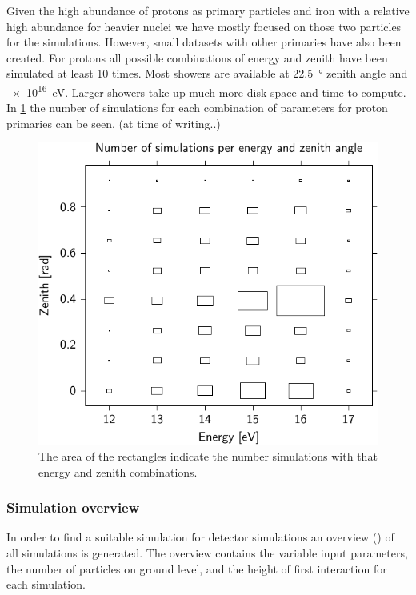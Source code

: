 Given the high abundance of protons as primary particles and iron with a
relative high abundance for heavier nuclei we have mostly focused on
those two particles for the simulations. However, small datasets with other primaries have also been created. For protons all possible combinations
of energy and zenith have been simulated at least 10 times. Most showers
are available at \SI{22.5}{\degree} zenith angle and \SI{e16}{\electronvolt}. Larger showers take up much more disk space and time to compute. In \ref{fig:simulations_proton_energy_zenith}
the number of simulations for each combination of parameters for proton primaries can be seen.
(at time of writing..)


\begin{figure}
    \centering
    \includegraphics[width=0.7\linewidth]
        {plots/simulations/proton_energy_zenith}
    \caption{ The area of the
             rectangles indicate the number simulations with that energy
             and zenith combinations.}
    \label{fig:simulations_proton_energy_zenith}
\end{figure}


\subsubsection{Simulation overview}

In order to find a suitable \corsika simulation for detector simulations
an overview (\hdf) of all \corsika simulations is generated. The
overview contains the variable input parameters, the number of particles on
ground level, and the height of first interaction for each simulation.



